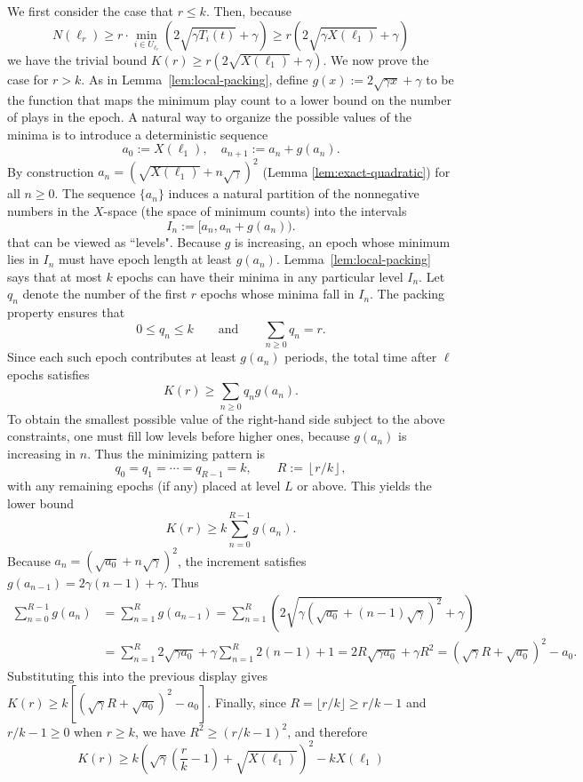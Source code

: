 \documentclass[opre,blindrev]{informs3}
\begin{document}
\begin{APPENDICES}
    We first consider the case that \(r \leq k\). Then, because 
    \[N(\ell_r)\geq r\cdot  \min_{i\in U_{\ell_r}}\left( 2\sqrt{\gamma T_{i}(t)}+ \gamma\right)\geq r\left(2\sqrt{\gamma X(\ell_1)}+ \gamma\right)\]
    we have the trivial bound \(K(r) \geq r\left(2\sqrt{X(\ell_1)}+ \gamma\right)\). We now prove the case for \(r > k\). As in Lemma~\ref{lem:local-packing}, define \(g(x) := 2\sqrt{\gamma x} + \gamma\) to be the function that maps the minimum play count to a lower bound on the number of plays in the epoch. A natural way to organize the possible values of the minima is to introduce a deterministic sequence
    \[
        a_0 := X(\ell_1), \quad a_{n+1} := a_n + g(a_n).
    \]
    By construction \(a_n = (\sqrt{X(\ell_1)}+n\sqrt{\gamma})^2\) (Lemma \ref{lem:exact-quadratic}) for all \(n\ge 0\).  The sequence \(\{a_n\}\) induces a natural partition of the nonnegative numbers in the \(X\)-space (the space of minimum counts) into the intervals
    \[
        I_n := [ a_n, a_n + g(a_n) ).
    \]
    that can be viewed as ``levels". Because \(g\) is increasing, an epoch whose minimum lies in \(I_n\) must have epoch length at least \(g(a_n)\). Lemma~\ref{lem:local-packing} says that at most \(k\) epochs can have their minima in any particular level \(I_n\). Let \(q_n\) denote the number of the first \(r\) epochs whose minima fall in \(I_n\).
    The packing property ensures that
    \[
        0  \leq q_n  \leq k
        \qquad\text{and}\qquad
        \sum_{n\ge 0} q_n = r.
    \]
    Since each such epoch contributes at least \(g(a_n)\) periods, the total time after
    \(\ell\) epochs satisfies
    \[
        K(r)
        \ge
        \sum_{n\ge 0} q_n  g(a_n).
    \]
    To obtain the smallest possible value of the right-hand side subject to the above constraints, one must fill low levels before higher ones, because \(g(a_n)\) is increasing in \(n\). Thus the minimizing pattern is
    \[
        q_0 = q_1 = \cdots = q_{R-1} = k,
        \qquad R := \left\lfloor {r}/{k}\right\rfloor,
    \]
    with any remaining epochs (if any) placed at level \(L\) or above.  This yields the
    lower bound
    \[
        K(r)
        \ge
        k \sum_{n=0}^{R-1} g(a_n).
    \]
    Because \(a_n = (\sqrt{a_0}+n\sqrt{\gamma})^2\), the increment satisfies \(g(a_{n-1}) = 2\gamma  (n-1) + \gamma\). Thus
    \begin{align*}
        \sum_{n=0}^{R-1} g(a_n)
        &= \sum_{n=1}^{R} g(a_{n-1})
        = \sum_{n=1}^{R} \left(2\sqrt{\gamma (\sqrt{a_0}+(n-1)\sqrt{\gamma})^2} + \gamma\right)\\
        &= \sum_{n=1}^{R} 2\sqrt{\gamma a_0}+\gamma  \sum_{n=1}^{R}2(n-1)  + 1
        = 2R\sqrt{\gamma a_0}+\gamma  R^2 = (\sqrt{\gamma}R+\sqrt{a_0})^2-a_0.
    \end{align*}
    Substituting this into the previous display gives \(K(r)\ge k [(\sqrt{\gamma}R+\sqrt{a_0})^2-a_0]\). Finally, since \(R = \lfloor r/k\rfloor \ge r/k - 1\) and \(r/k - 1\geq 0\) when \(r \geq k\), we have \(R^2 \ge (r/k - 1)^2\),
    and therefore
    \[
        K(r)
        \ge
        k\left(\sqrt{\gamma}\left(\frac{r}{k} - 1\right)+\sqrt{X(\ell_1)}\right)^2-kX(\ell_1)
    \]


\end{APPENDICES}
\end{document}
